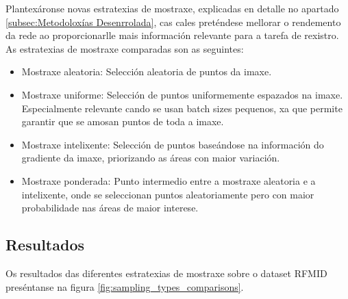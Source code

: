Plantexáronse novas estratexias de mostraxe, explicadas en detalle no apartado \ref{subsec:Metodoloxías Desenrrolada}, cas cales preténdese mellorar o rendemento da rede ao proporcionarlle mais información relevante para a tarefa de rexistro.
As estratexias de mostraxe comparadas son as seguintes:
\begin{itemize}
    \item Mostraxe aleatoria: Selección aleatoria de puntos da imaxe.
    \item Mostraxe uniforme: Selección de puntos uniformemente espazados na imaxe. Especialmente relevante cando se usan batch sizes pequenos, xa que permite garantir que se amosan puntos de toda a imaxe.
    \item Mostraxe intelixente: Selección de puntos baseándose na información do gradiente da imaxe, priorizando as áreas con maior variación.
    \item Mostraxe ponderada: Punto intermedio entre a mostraxe aleatoria e a intelixente, onde se seleccionan puntos aleatoriamente pero con maior probabilidade nas áreas de maior interese.
\end{itemize}

\subsection{Resultados}
\label{subsec:Resultados-sampling}

Os resultados das diferentes estratexias de mostraxe sobre o dataset RFMID preséntanse na figura \ref{fig:sampling_types_comparisons}.

